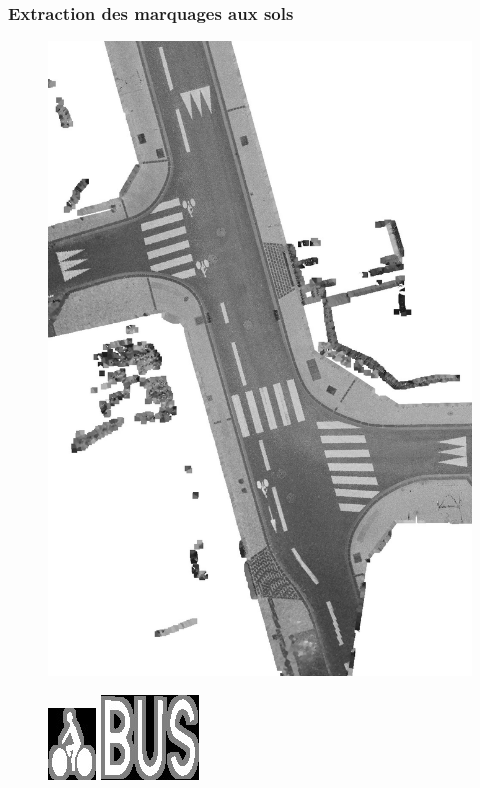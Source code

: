\documentclass{beamer}
\newcommand{\patternscale}{.3}
\newcommand{\patternspace}{1mm}
\begin{document}
\begin{frame}
\frametitle{Extraction des marquages aux sols}
\begin{center}
\begin{figure}[ht]
\includegraphics[angle = 90, width = .85\linewidth, scale = 0.7]{im_basis_crop_white}
\end{figure}
\begin{figure}[ht]
\includegraphics[scale = \patternscale]{patterns/1.jpg}\hspace*{\patternspace}
\includegraphics[scale = \patternscale]{patterns/2.jpg}\hspace*{\patternspace}

\end{figure}
\end{center}
\end{frame}
\end{document}
